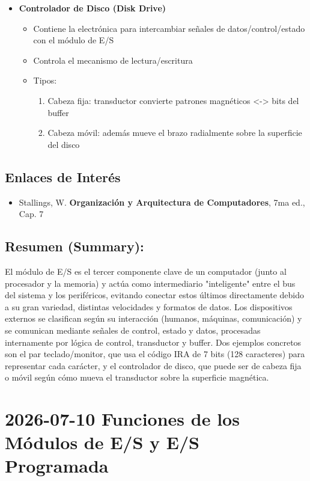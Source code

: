 \documentclass{article}
\begin{document}
\begin{itemize}
\begin{itemize}
\item El código IRA suele almacenarse con 8 bits (octeto/byte), el octavo bit es de paridad
\end{itemize}
\item \textbf{Controlador de Disco (Disk Drive)}
\begin{itemize}
\item Contiene la electrónica para intercambiar señales de datos/control/estado con el módulo de E/S
\item Controla el mecanismo de lectura/escritura
\item Tipos:
\begin{enumerate}
\item Cabeza fija: transductor convierte patrones magnéticos <-> bits del buffer
\item Cabeza móvil: además mueve el brazo radialmente sobre la superficie del disco
\end{enumerate}
\end{itemize}
\end{itemize}
\subsection{Enlaces de Interés}
\label{sec:org4f23924}
\begin{itemize}
\item Stallings, W. \textbf{Organización y Arquitectura de Computadores}, 7ma ed., Cap. 7
\end{itemize}
\subsection{Resumen (Summary):}
\label{sec:org1c95067}
El módulo de E/S es el tercer componente clave de un computador (junto
al procesador y la memoria) y actúa como intermediario "inteligente"
entre el bus del sistema y los periféricos, evitando conectar estos
últimos directamente debido a su gran variedad, distintas velocidades
y formatos de datos. Los dispositivos externos se clasifican según su
interacción (humanos, máquinas, comunicación) y se comunican mediante
señales de control, estado y datos, procesadas internamente por lógica
de control, transductor y buffer. Dos ejemplos concretos son el par
teclado/monitor, que usa el código IRA de 7 bits (128 caracteres) para
representar cada carácter, y el controlador de disco, que puede ser de
cabeza fija o móvil según cómo mueva el transductor sobre la
superficie magnética.
\section{2026-07-10 Funciones de los Módulos de E/S y E/S Programada}
\label{sec:orgaff78e4}
\end{document}
